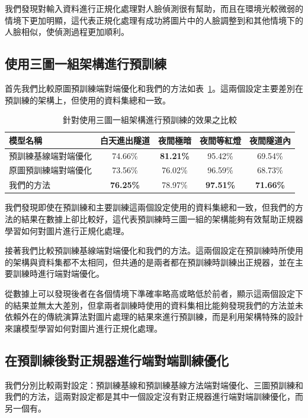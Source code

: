 我們發現對輸入資料進行正規化處理對人臉偵測很有幫助，而且在環境光較微弱的情境下更加明顯，這代表正規化處理有成功將圖片中的人臉調整到和其他情境下的人臉相似，使偵測過程更加順利。

\subsection{使用三圖一組架構進行預訓練}

首先我們比較原圖預訓練端對端優化和我們的方法如表~\ref{table:triple_compare}。這兩個設定主要差別在預訓練的架構上，但使用的資料集總和一致。

\begin{table}[ht]
    \caption{針對使用三圖一組架構進行預訓練的效果之比較}
    \centering
    \begin{tabular}{l c c c c}
        \hline
        模型名稱 & 白天進出隧道 & 夜間極暗 & 夜間等紅燈 & 夜間隧道內 \\
        \hline
        預訓練基線端對端優化 & 74.66\% & \textbf{81.21\%} &95.42\% & 69.54\% \\
        原圖預訓練端對端優化 & 73.56\% & 76.02\% & 96.59\% & 68.73\% \\
        我們的方法 & \textbf{76.25\%} & 78.97\% & \textbf{97.51\%} & \textbf{71.66\%} \\
        \hline
    \end{tabular}
    \label{table:triple_compare}
\end{table}

我們發現即使在預訓練和主要訓練這兩個設定使用的資料集總和一致，但我們的方法的結果在數據上卻比較好，這代表預訓練時三圖一組的架構能夠有效幫助正規器學習如何對圖片進行正規化處理。

接著我們比較預訓練基線端對端優化和我們的方法。這兩個設定在預訓練時所使用的架構與資料集都不太相同，但共通的是兩者都在預訓練時訓練出正規器，並在主要訓練時進行端對端優化。

從數據上可以發現後者在各個情境下準確率略高或略低於前者，顯示這兩個設定下的結果並無太大差別，但拿兩者訓練時使用的資料集相比能夠發現我們的方法並未依賴外在的傳統演算法對圖片處理的結果來進行預訓練，而是利用架構特殊的設計來讓模型學習如何對圖片進行正規化處理。

\subsection{在預訓練後對正規器進行端對端訓練優化}

我們分別比較兩對設定：預訓練基線和預訓練基線方法端對端優化、三圖預訓練和我們的方法，這兩對設定都是其中一個設定沒有對正規器進行端對端訓練優化，而另一個有。

